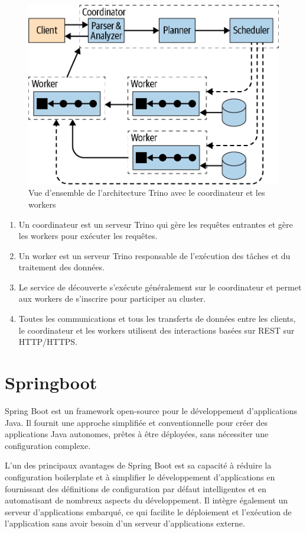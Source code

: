 \begin{figure}[H]
\centering
\includegraphics[width=0.8\linewidth]{images/trino_architecture.png}
\caption{Vue d'ensemble de l'architecture Trino avec le coordinateur et les workers}\label{fig:trino-architecture}
\end{figure}

\begin{enumerate}
	\item Un coordinateur est un serveur Trino qui gère les requêtes entrantes et gère les workers pour exécuter les requêtes.
	\item Un worker est un serveur Trino responsable de l'exécution des tâches et du traitement des données.
	\item Le service de découverte s'exécute généralement sur le coordinateur et permet aux workers de s'inscrire pour participer au cluster.
	\item Toutes les communications et tous les transferts de données entre les clients, le coordinateur et les workers utilisent des interactions basées sur REST sur HTTP/HTTPS.
\end{enumerate}

\section{Springboot}

Spring Boot est un framework open-source pour le développement d'applications Java. Il fournit une approche simplifiée et conventionnelle pour créer des applications Java autonomes, prêtes à être déployées, sans nécessiter une configuration complexe.

L'un des principaux avantages de Spring Boot est sa capacité à réduire la configuration boilerplate et à simplifier le développement d'applications en fournissant des définitions de configuration par défaut intelligentes et en automatisant de nombreux aspects du développement. Il intègre également un serveur d'applications embarqué, ce qui facilite le déploiement et l'exécution de l'application sans avoir besoin d'un serveur d'applications externe.

